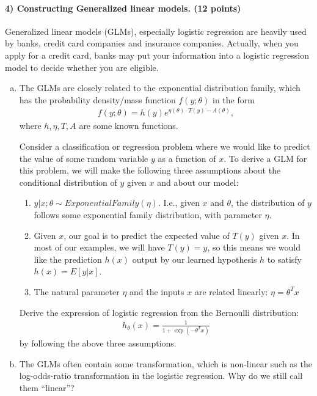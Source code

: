 \documentclass[11pt]{article}
\begin{document}
\paragraph{4) Constructing Generalized linear models. (12 points)}
Generalized linear models (GLMs), especially logistic regression are heavily used by banks, credit card companies and insurance companies. Actually, when you apply for a credit card, banks may put your information into a logistic regression model to decide whether you are eligible.
\begin{enumerate}[(a)]
\item The GLMs are closely related to the exponential distribution family, which has the probability density/mass function $f(y; \theta)$ in the form
\begin{align}
f(y; \theta) = h(y)e^{\eta(\theta)\cdot T(y)-A(\theta)},
\end{align}
where $h,\eta,T,A$ are some known functions.

Consider a classification or regression problem where we would like to predict the value of some random variable $y$ as a function of
$x$. To derive a GLM for this problem, we will make the following three assumptions about the conditional distribution of $y$ given $x$ and about our model:
\begin{enumerate}[1.]
\item
$y | x; \theta \sim ExponentialFamily(\eta)$. I.e., given $x$ and $\theta$, the distribution of $y$ follows some exponential family distribution, with parameter $\eta$.
\item
Given $x$, our goal is to predict the expected value of $T(y)$ given $x$. In most of our examples, we will have $T(y) = y$, so this means we
would like the prediction $h(x)$ output by our learned hypothesis $h$ to satisfy $h(x) = E[y|x]$.
\item
The natural parameter $\eta$ and the inputs $x$ are related linearly: $\eta = \theta^T x$
\end{enumerate}
Derive the expression of logistic regression from the Bernoulli distribution:
\begin{align}
h_{\theta}(x)=\frac{1}{1+\exp(-\theta^Tx)}
\end{align}
by following the above three assumptions.
\item
The GLMs often contain some transformation, which is non-linear such as the log-odds-ratio transformation in the logistic regression. Why do we still call them ``linear''?
\end{enumerate}
\end{document}
